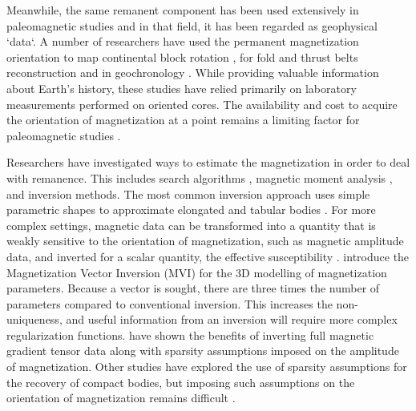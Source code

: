 Meanwhile, the same remanent component has been used extensively in paleomagnetic studies and in that field, it has been regarded as geophysical `data`. A number of researchers have used the permanent magnetization orientation to map continental block rotation \cite[]{Norris1961, Vine1963, NATOASIS1989}, for fold and thrust belts reconstruction \cite[]{Ramon2012, Villalain2015} and in geochronology \cite[]{Henkel1991, Lockhart2004, Enkin2003}.
While providing valuable information about Earth's history, these studies have relied primarily on laboratory measurements performed on oriented cores. The availability and cost to acquire the orientation of magnetization at a point remains a limiting factor for paleomagnetic studies \cite[]{Pueyo2016}.

Researchers have investigated ways to estimate the magnetization in order to deal with remanence. This includes search
algorithms \cite[]{Fedi1994, DannemillerLi06}, magnetic moment analysis \cite[]{Helbig1963, Phillips03}, and inversion methods. The most common inversion approach uses simple parametric shapes to approximate elongated and tabular bodies \cite[]{Foss2011a, Clark2014, Pratt2014,Fullagar2013}. For more complex settings, magnetic data can be transformed into a quantity that is weakly sensitive to the orientation of magnetization, such as magnetic amplitude data, and inverted for a scalar quantity, the effective susceptibility \cite[]{Shearer05}. \cite{LelievreOldenburg2009} introduce the Magnetization Vector Inversion (MVI) for the 3D modelling of magnetization parameters. Because a vector is sought, there are three times the number of parameters compared to conventional inversion. This increases the non-uniqueness, and useful information from an inversion will require more complex regularization functions. \cite{Queitsch2019} have shown the benefits of inverting full magnetic gradient tensor data along with sparsity assumptions imposed on the amplitude of magnetization. Other studies have explored the use of sparsity assumptions for the recovery of compact bodies, but imposing such assumptions on the orientation of magnetization remains difficult \cite[]{Zhu2015, Liu2015, Fournier2015}.  

